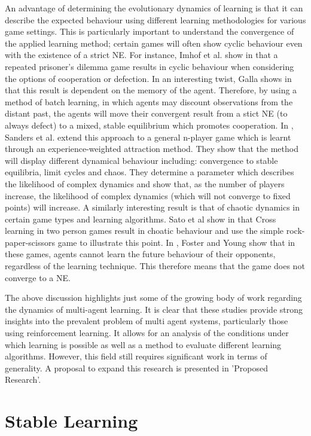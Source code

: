 \documentclass[../sample.tex]{subfiles}
\begin{document}
An advantage of determining the evolutionary dynamics of learning is that it can describe the
expected behaviour using different learning methodologies for various game settings. This is
particularly important to understand the convergence of the applied learning method; certain games
will often show cyclic behaviour even with the existence of a strict NE. For instance, Imhof et al.
show in \cite{Imhof2005} that a repeated prisoner's dilemma game results in cyclic behaviour when
considering the options of cooperation or defection. In an interesting twist, Galla shows in
\cite{Galla2011} that this result is dependent on the memory of the agent. Therefore, by using a
method of batch learning, in which agents may discount observations from the distant past, the
agents will move their convergent result from a stict NE (to always defect) to a mixed, stable
equilibrium which promotes cooperation. In \cite{Sanders2018}, Sanders et al. extend this approach
to a general n-player game which is learnt through an experience-weighted attraction method. They
show that the method will display different dynamical behaviour including: convergence to stable
equilibria, limit cycles and chaos. They determine a parameter which describes the likelihood of
complex dynamics and show that, as the number of players increase, the likelihood of complex
dynamics (which will not converge to fixed points) will increase. A similarly interesting result is
that of chaotic dynamics in certain game types and learning algorithms. Sato et al show in
\cite{Sato2002} that Cross learning in two person games result in choatic behaviour and use the
simple rock-paper-scissors game to illustrate this point. In \cite{Foster2001}, Foster and Young
show that in these games, agents cannot learn the future behaviour of their opponents, regardless of
the learning technique. This therefore means that the game does not converge to a NE.

The above discussion highlights just some of the growing body of work regarding the dynamics of
multi-agent learning. It is clear that these studies provide strong insights into the prevalent
problem of multi agent systems, particularly those using reinforcement learning. It allows for an
analysis of the conditions under which learning is possible as well as a method to evaluate
different learning algorithms. However, this field still requires significant work in terms of
generality. A proposal to expand this research is presented in 'Proposed Research'.

\section{Stable Learning}
\end{document}
